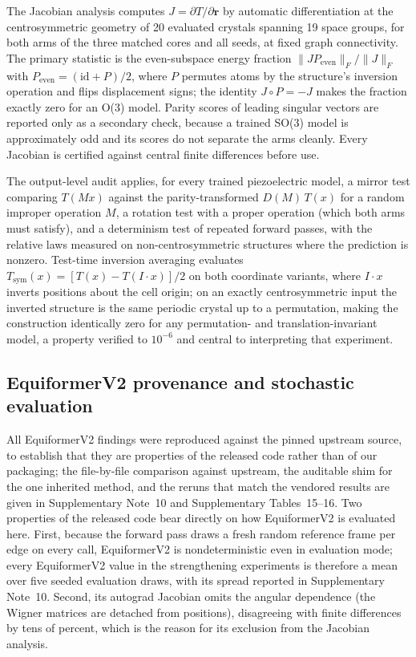 The Jacobian analysis computes $J = \partial T/\partial \mathbf{r}$ by automatic differentiation at the centrosymmetric geometry of 20 evaluated crystals spanning 19 space groups, for both arms of the three matched cores and all seeds, at fixed graph connectivity. The primary statistic is the even-subspace energy fraction $\lVert J P_{\mathrm{even}}\rVert_F / \lVert J \rVert_F$ with $P_{\mathrm{even}} = (\mathrm{id} + P)/2$, where $P$ permutes atoms by the structure's inversion operation and flips displacement signs; the identity $J \circ P = -J$ makes the fraction exactly zero for an O(3) model. Parity scores of leading singular vectors are reported only as a secondary check, because a trained SO(3) model is approximately odd and its scores do not separate the arms cleanly. Every Jacobian is certified against central finite differences before use.

The output-level audit applies, for every trained piezoelectric model, a mirror test comparing $T(Mx)$ against the parity-transformed $D(M)\,T(x)$ for a random improper operation $M$, a rotation test with a proper operation (which both arms must satisfy), and a determinism test of repeated forward passes, with the relative laws measured on non-centrosymmetric structures where the prediction is nonzero. Test-time inversion averaging evaluates $T_{\mathrm{sym}}(x) = [T(x) - T(I\!\cdot\!x)]/2$ on both coordinate variants, where $I\!\cdot\!x$ inverts positions about the cell origin; on an exactly centrosymmetric input the inverted structure is the same periodic crystal up to a permutation, making the construction identically zero for any permutation- and translation-invariant model, a property verified to $10^{-6}$ and central to interpreting that experiment.

\subsection*{EquiformerV2 provenance and stochastic evaluation}

All EquiformerV2 findings were reproduced against the pinned upstream source, to establish that they are properties of the released code rather than of our packaging; the file-by-file comparison against upstream, the auditable shim for the one inherited method, and the reruns that match the vendored results are given in Supplementary Note~10 and Supplementary Tables~15--16. Two properties of the released code bear directly on how EquiformerV2 is evaluated here. First, because the forward pass draws a fresh random reference frame per edge on every call, EquiformerV2 is nondeterministic even in evaluation mode; every EquiformerV2 value in the strengthening experiments is therefore a mean over five seeded evaluation draws, with its spread reported in Supplementary Note~10. Second, its autograd Jacobian omits the angular dependence (the Wigner matrices are detached from positions), disagreeing with finite differences by tens of percent, which is the reason for its exclusion from the Jacobian analysis.

